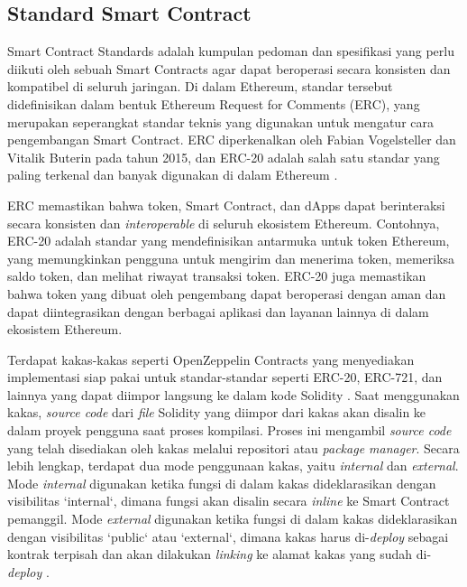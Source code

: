 \subsection{Standard Smart Contract}
\label{subsec:standard-sc}

Smart Contract Standards adalah kumpulan pedoman dan spesifikasi yang perlu diikuti oleh sebuah Smart Contracts agar dapat beroperasi secara konsisten dan kompatibel di seluruh jaringan. Di dalam Ethereum, standar tersebut didefinisikan dalam bentuk Ethereum Request for Comments (ERC), yang merupakan seperangkat standar teknis yang digunakan untuk mengatur cara pengembangan Smart Contract. ERC diperkenalkan oleh Fabian Vogelsteller dan Vitalik Buterin pada tahun 2015, dan ERC-20 adalah salah satu standar yang paling terkenal dan banyak digunakan di dalam Ethereum \parencite{vogelsteller2015erc20}.

ERC memastikan bahwa token, Smart Contract, dan dApps dapat berinteraksi secara konsisten dan \textit{interoperable} di seluruh ekosistem Ethereum. Contohnya, ERC-20 adalah standar yang mendefinisikan antarmuka untuk token Ethereum, yang memungkinkan pengguna untuk mengirim dan menerima token, memeriksa saldo token, dan melihat riwayat transaksi token. ERC-20 juga memastikan bahwa token yang dibuat oleh pengembang dapat beroperasi dengan aman dan dapat diintegrasikan dengan berbagai aplikasi dan layanan lainnya di dalam ekosistem Ethereum.

Terdapat kakas-kakas seperti OpenZeppelin Contracts yang menyediakan implementasi siap pakai untuk standar-standar seperti ERC-20, ERC-721, dan lainnya yang dapat diimpor langsung ke dalam kode Solidity \parencite{openzeppelin_contracts_5x}. Saat menggunakan kakas, \textit{source code} dari \textit{file} Solidity yang diimpor dari kakas akan disalin ke dalam proyek pengguna saat proses kompilasi. Proses ini mengambil \textit{source code} yang telah disediakan oleh kakas melalui repositori atau \textit{package manager}. Secara lebih lengkap, terdapat dua mode penggunaan kakas, yaitu \textit{internal} dan \textit{external}. Mode \textit{internal} digunakan ketika fungsi di dalam kakas dideklarasikan dengan visibilitas `internal`, dimana fungsi akan disalin secara \textit{inline} ke Smart Contract pemanggil. Mode \textit{external} digunakan ketika fungsi di dalam kakas dideklarasikan dengan visibilitas `public` atau `external`, dimana kakas harus di-\textit{deploy} sebagai kontrak terpisah dan akan dilakukan \textit{linking} ke alamat kakas yang sudah di-\textit{deploy} \parencite{solidity_lowlevelcalls}.

